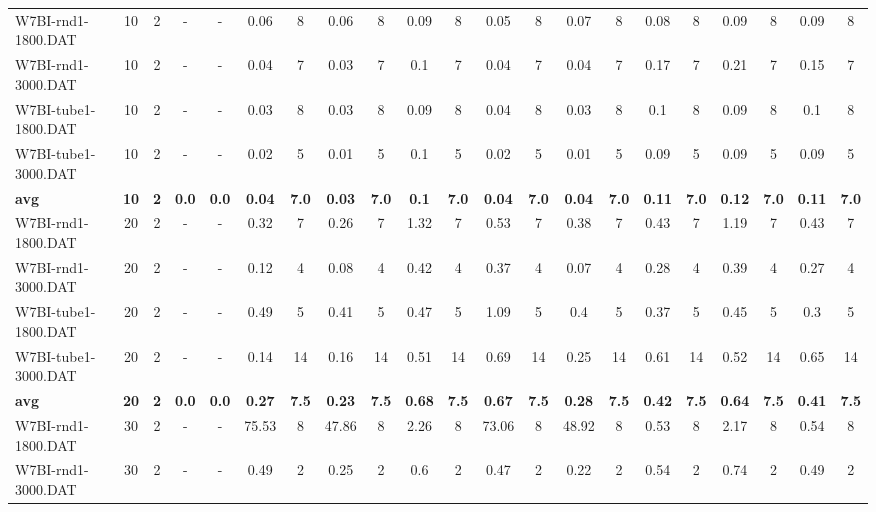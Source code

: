 \begin{sidewaystable}[!ht]
{\begin{tabular}{lcccccccccccccccccccc}
W7BI-rnd1-1800.DAT & 10 & 2 &  - &  - & 0.06 & 8 & 0.06 & 8 & 0.09 & 8 &  \textcolor{blue2}{0.05} & 8 & 0.07 & 8 & 0.08 & 8 & 0.09 & 8 & 0.09 & 8 \\
W7BI-rnd1-3000.DAT & 10 & 2 &  - &  - & 0.04 & 7 &  \textcolor{blue2}{0.03} & 7 & 0.1 & 7 & 0.04 & 7 & 0.04 & 7 & 0.17 & 7 & 0.21 & 7 & 0.15 & 7 \\
W7BI-tube1-1800.DAT & 10 & 2 &  - &  - &  \textcolor{blue2}{0.03} & 8 &  \textcolor{blue2}{0.03} & 8 & 0.09 & 8 & 0.04 & 8 &  \textcolor{blue2}{0.03} & 8 & 0.1 & 8 & 0.09 & 8 & 0.1 & 8 \\
W7BI-tube1-3000.DAT & 10 & 2 &  - &  - & 0.02 & 5 &  \textcolor{blue2}{0.01} & 5 & 0.1 & 5 & 0.02 & 5 &  \textcolor{blue2}{0.01} & 5 & 0.09 & 5 & 0.09 & 5 & 0.09 & 5 \\
\cline{1-21} \textbf{avg} & \textbf{10} & \textbf{2} & \textbf{0.0} & \textbf{0.0} & \textbf{0.04} & \textbf{7.0} & \textbf{0.03} & \textbf{7.0} & \textbf{0.1} & \textbf{7.0} & \textbf{0.04} & \textbf{7.0} & \textbf{0.04} & \textbf{7.0} & \textbf{0.11} & \textbf{7.0} & \textbf{0.12} & \textbf{7.0} & \textbf{0.11} & \textbf{7.0} \\ \cline{1-21}
W7BI-rnd1-1800.DAT & 20 & 2 &  - &  - & 0.32 & 7 &  \textcolor{blue2}{0.26} & 7 & 1.32 & 7 & 0.53 & 7 & 0.38 & 7 & 0.43 & 7 & 1.19 & 7 & 0.43 & 7 \\
W7BI-rnd1-3000.DAT & 20 & 2 &  - &  - & 0.12 & 4 & 0.08 & 4 & 0.42 & 4 & 0.37 & 4 &  \textcolor{blue2}{0.07} & 4 & 0.28 & 4 & 0.39 & 4 & 0.27 & 4 \\
W7BI-tube1-1800.DAT & 20 & 2 &  - &  - & 0.49 & 5 & 0.41 & 5 & 0.47 & 5 & 1.09 & 5 & 0.4 & 5 & 0.37 & 5 & 0.45 & 5 &  \textcolor{blue2}{0.3} & 5 \\
W7BI-tube1-3000.DAT & 20 & 2 &  - &  - &  \textcolor{blue2}{0.14} & 14 & 0.16 & 14 & 0.51 & 14 & 0.69 & 14 & 0.25 & 14 & 0.61 & 14 & 0.52 & 14 & 0.65 & 14 \\
\cline{1-21} \textbf{avg} & \textbf{20} & \textbf{2} & \textbf{0.0} & \textbf{0.0} & \textbf{0.27} & \textbf{7.5} & \textbf{0.23} & \textbf{7.5} & \textbf{0.68} & \textbf{7.5} & \textbf{0.67} & \textbf{7.5} & \textbf{0.28} & \textbf{7.5} & \textbf{0.42} & \textbf{7.5} & \textbf{0.64} & \textbf{7.5} & \textbf{0.41} & \textbf{7.5} \\ \cline{1-21}
W7BI-rnd1-1800.DAT & 30 & 2 &  - &  - & 75.53 & 8 & 47.86 & 8 & 2.26 & 8 & 73.06 & 8 & 48.92 & 8 &  \textcolor{blue2}{0.53} & 8 & 2.17 & 8 & 0.54 & 8 \\
W7BI-rnd1-3000.DAT & 30 & 2 &  - &  - & 0.49 & 2 & 0.25 & 2 & 0.6 & 2 & 0.47 & 2 &  \textcolor{blue2}{0.22} & 2 & 0.54 & 2 & 0.74 & 2 & 0.49 & 2 \\

\end{tabular}}
\end{sidewaystable}
